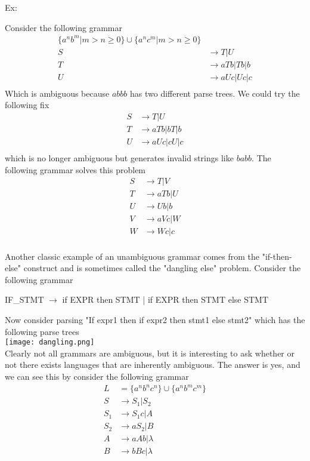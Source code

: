 \documentclass[11pt]{exam}
\begin{document}
Ex:
\begin{center}
Consider the following grammar
\begin{align*}
\{a^nb^m | m > n \geq 0 \} \cup \{a^nc^m | m > n \geq 0 \}\\
S &\rightarrow T | U\\
T &\rightarrow aTb | Tb | b\\
U &\rightarrow aUc | Uc | c\\
\end{align*}
Which is ambiguous because $abbb$ has two different parse trees. We could try the following fix
\begin{align*}
S &\rightarrow T | U\\
T &\rightarrow aTb | bT | b\\
U &\rightarrow aUc | cU | c\\
\end{align*}
which is no longer ambiguous but generates invalid strings like $babb$. The following grammar solves this problem
\begin{align*}
S &\rightarrow T | V\\
T &\rightarrow aTb | U\\
U &\rightarrow Ub | b\\
V &\rightarrow aVc | W\\
W &\rightarrow Wc | c\\
\end{align*}
\end{center}

Another classic example of an unambiguous grammar comes from the "if-then-else" construct and is sometimes called the "dangling else" problem. Consider the following grammar
\begin{center}
IF\_STMT $\rightarrow$ if EXPR then STMT | if EXPR then STMT else  STMT
\end{center}
Now consider parsing "If expr1 then if expr2 then stmt1 else stmt2"
which has the following parse trees\\
\texttt{[image: dangling.png]}\\

Clearly not all grammars are ambiguous, but it is interesting to ask whether or not there exists languages that are inherently ambiguous. The answer is yes, and we can see this by consider the following grammar
\begin{align*}
L &= \{a^nb^nc^n\} \cup \{a^nb^mc^m\}\\
S &\rightarrow S_1 | S_2\\
S_1 &\rightarrow S_1c | A\\
S_2 &\rightarrow aS_2 | B\\
A &\rightarrow aAb | \lambda\\
B &\rightarrow bBc | \lambda\\
\end{align*}
\end{document}
